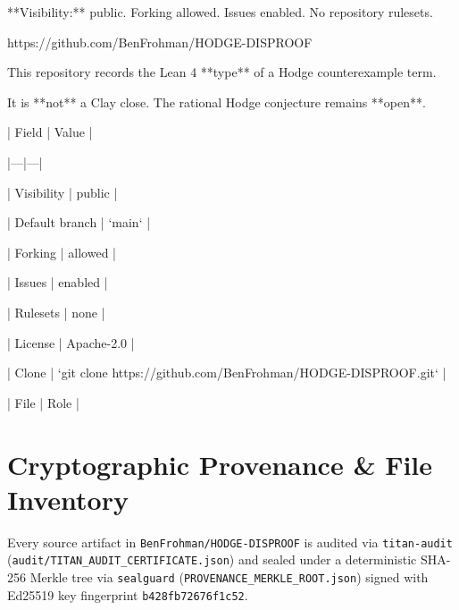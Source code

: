 \documentclass[11pt,a4paper]{article}
\begin{document}
**Visibility:** public. Forking allowed. Issues enabled. No repository rulesets.

https://github.com/BenFrohman/HODGE-DISPROOF

This repository records the Lean 4 **type** of a Hodge counterexample term.

It is **not** a Clay close. The rational Hodge conjecture remains **open**.

| Field | Value |

|---|---|

| Visibility | public |

| Default branch | `main` |

| Forking | allowed |

| Issues | enabled |

| Rulesets | none |

| License | Apache-2.0 |

| Clone | `git clone https://github.com/BenFrohman/HODGE-DISPROOF.git` |

| File | Role |

\section{Cryptographic Provenance \& File Inventory}
Every source artifact in \texttt{BenFrohman/HODGE-DISPROOF} is audited via \texttt{titan-audit}
(\texttt{audit/TITAN\_AUDIT\_CERTIFICATE.json}) and sealed under a deterministic SHA-256 Merkle tree via
\texttt{sealguard} (\texttt{PROVENANCE\_MERKLE\_ROOT.json}) signed with Ed25519 key fingerprint
\texttt{b428fb72676f1c52}.
\end{document}
